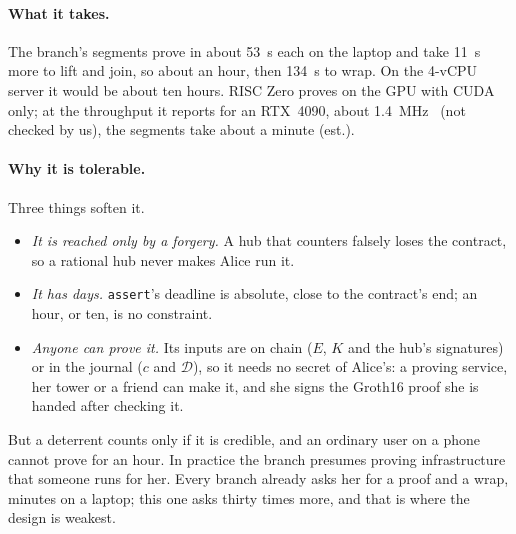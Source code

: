 \documentclass[11pt]{article}
\newcommand{\tx}[1]{\texttt{#1}}
\begin{document}
\paragraph{What it takes.} The branch's segments prove in about 53~s
each on the laptop and take 11~s more to lift and join, so about an hour,
then 134~s to wrap. On the 4-vCPU server it would be about ten hours.
RISC Zero proves on the GPU with CUDA only; at the throughput it reports
for an RTX~4090, about 1.4~MHz~\cite{risc0bench} (not checked by us), the
segments take about a minute (est.).

\paragraph{Why it is tolerable.} Three things soften it.
\begin{itemize}[leftmargin=1.5em]
\item \emph{It is reached only by a forgery.} A hub that counters falsely
  loses the contract, so a rational hub never makes Alice run it.
\item \emph{It has days.} \tx{assert}'s deadline is absolute, close to
  the contract's end; an hour, or ten, is no constraint.
\item \emph{Anyone can prove it.} Its inputs are on chain ($E$, $K$ and
  the hub's signatures) or in the journal ($c$ and $\mathcal{D}$), so it
  needs no secret of Alice's: a proving service, her tower or a friend
  can make it, and she signs the Groth16 proof she is handed after
  checking it.
\end{itemize}
But a deterrent counts only if it is credible, and an ordinary user on a
phone cannot prove for an hour. In practice the branch presumes proving
infrastructure that someone runs for her. Every branch already asks
her for a proof and a wrap, minutes on a laptop; this one asks thirty
times more, and that is where the design is weakest.
\end{document}

